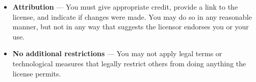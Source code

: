 {\begin{frame}[plain]
\begin{tcolorbox}[colback=my-grey,
		colframe=my-grey,  
		center, arc=0pt,outer arc=0pt,
		valign=top, 
		halign=left,
		width=\textwidth]
		\begin{itemize}
			\item[] \textbf{Attribution} — You must give appropriate credit, provide a link to the license, and indicate if changes were made. You may do so in any reasonable manner, but not in any way that suggests the licensor endorses you or your use.
			\item[] \textbf{No additional restrictions} — You may not apply legal terms or technological measures that legally restrict others from doing anything the license permits.
		\end{itemize}
		
	\end{tcolorbox}
	

%
%	

	\end{frame}
}

